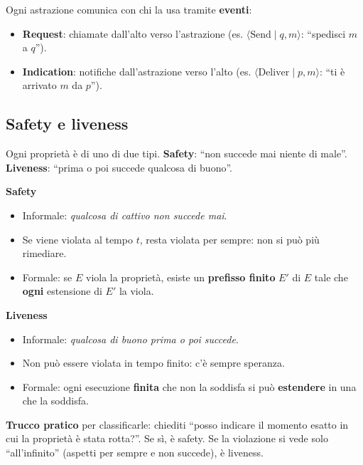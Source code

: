 Ogni astrazione comunica con chi la usa tramite \textbf{eventi}:

\begin{itemize}
\tightlist
\item
  \textbf{Request}: chiamate dall'alto verso l'astrazione (es. \(\langle \text{Send} \mid q, m \rangle\): ``spedisci \(m\) a \(q\)'').
\item
  \textbf{Indication}: notifiche dall'astrazione verso l'alto (es. \(\langle \text{Deliver} \mid p, m \rangle\): ``ti è arrivato \(m\) da \(p\)'').
\end{itemize}

\subsection{Safety e liveness}

\begin{inbreve}

Ogni proprietà è di uno di due tipi. \textbf{Safety}: ``non succede mai niente di male''. \textbf{Liveness}: ``prima o poi succede qualcosa di buono''.

\end{inbreve}

\textbf{Safety}

\begin{itemize}
\tightlist
\item
  Informale: \emph{qualcosa di cattivo non succede mai}.
\item
  Se viene violata al tempo \(t\), resta violata per sempre: non si può più rimediare.
\item
  Formale: se \(E\) viola la proprietà, esiste un \textbf{prefisso finito} \(E'\) di \(E\) tale che \textbf{ogni} estensione di \(E'\) la viola.
\end{itemize}

\textbf{Liveness}

\begin{itemize}
\tightlist
\item
  Informale: \emph{qualcosa di buono prima o poi succede}.
\item
  Non può essere violata in tempo finito: c'è sempre speranza.
\item
  Formale: ogni esecuzione \textbf{finita} che non la soddisfa si può \textbf{estendere} in una che la soddisfa.
\end{itemize}

\textbf{Trucco pratico} per classificarle: chiediti ``posso indicare il momento esatto in cui la proprietà è stata rotta?''. Se sì, è safety. Se la violazione si vede solo ``all'infinito'' (aspetti per sempre e non succede), è liveness.

